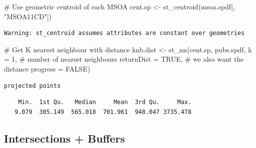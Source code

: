 \documentclass[
  letterpaper,
  DIV=11,
  numbers=noendperiod]{scrreprt}
\newenvironment{Shaded}{\begin{snugshade}}{\end{snugshade}}
\newcommand{\AttributeTok}[1]{\textcolor[rgb]{0.40,0.45,0.13}{#1}}
\newcommand{\CommentTok}[1]{\textcolor[rgb]{0.37,0.37,0.37}{#1}}
\newcommand{\ConstantTok}[1]{\textcolor[rgb]{0.56,0.35,0.01}{#1}}
\newcommand{\DecValTok}[1]{\textcolor[rgb]{0.68,0.00,0.00}{#1}}
\newcommand{\FunctionTok}[1]{\textcolor[rgb]{0.28,0.35,0.67}{#1}}
\newcommand{\NormalTok}[1]{\textcolor[rgb]{0.00,0.23,0.31}{#1}}
\newcommand{\OtherTok}[1]{\textcolor[rgb]{0.00,0.23,0.31}{#1}}
\newcommand{\SpecialCharTok}[1]{\textcolor[rgb]{0.37,0.37,0.37}{#1}}
\newcommand{\StringTok}[1]{\textcolor[rgb]{0.13,0.47,0.30}{#1}}
\begin{document}
\begin{Shaded}
\begin{Highlighting}[]
\CommentTok{\# Use geometric centroid of each MSOA}
\NormalTok{cent.sp }\OtherTok{\textless{}{-}} \FunctionTok{st\_centroid}\NormalTok{(msoa.spdf[, }\StringTok{"MSOA11CD"}\NormalTok{])}
\end{Highlighting}
\end{Shaded}

\begin{verbatim}
Warning: st_centroid assumes attributes are constant over geometries
\end{verbatim}

\begin{Shaded}
\begin{Highlighting}[]
\CommentTok{\# Get K nearest neighbour with distance}
\NormalTok{knb.dist }\OtherTok{\textless{}{-}} \FunctionTok{st\_nn}\NormalTok{(cent.sp, }
\NormalTok{                  pubs.spdf,}
                  \AttributeTok{k =} \DecValTok{1}\NormalTok{,             }\CommentTok{\# number of nearest neighbours}
                  \AttributeTok{returnDist =} \ConstantTok{TRUE}\NormalTok{, }\CommentTok{\# we also want the distance}
                  \AttributeTok{progress =} \ConstantTok{FALSE}\NormalTok{)}
\end{Highlighting}
\end{Shaded}

\begin{verbatim}
projected points
\end{verbatim}

\begin{Shaded}
\end{Shaded}

\begin{verbatim}
    Min.  1st Qu.   Median     Mean  3rd Qu.     Max. 
   9.079  305.149  565.018  701.961  948.047 3735.478 
\end{verbatim}

\hypertarget{intersections-buffers}{%
\subsection{Intersections + Buffers}\label{intersections-buffers}}
\end{document}
